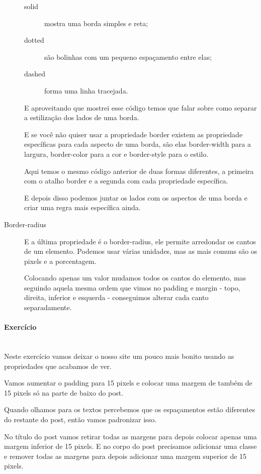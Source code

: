 \documentclass[12pt,a4paper]{article}
\begin{document}
\begin{description}
		\begin{description}
			\item[solid] mostra uma borda simples e reta;
			\item[dotted] são bolinhas com um pequeno espaçamento entre elas;
			\item[dashed] forma uma linha tracejada.
		\end{description}
		
		E aproveitando que mostrei esse código temos que falar sobre como separar a estilização dos lados de uma borda.
		
		E se você não quiser usar a propriedade border existem as propriedade específicas para cada aspecto de uma borda, são elas border-width para a largura, border-color para a cor e border-style para o estilo.
		
		Aqui temos o mesmo código anterior de duas formas diferentes, a primeira com o atalho border e a segunda com cada propriedade específica.
		
		E depois disso podemos juntar os lados com os aspectos de uma borda e criar uma regra mais específica ainda.
		
		\item[Border-radius] E a última propriedade é o border-radius, ele permite arredondar os cantos de um elemento. Podemos usar várias unidades, mas as mais comuns são os pixels e a porcentagem.
		
		Colocando apenas um valor mudamos todos os cantos do elemento, mas seguindo aquela mesma ordem que vimos no padding e margin - topo, direita, inferior e esquerda -  conseguimos alterar cada canto separadamente.
	\end{description}
	
	\paragraph{Exercício} \mbox{} \\
	
	Neste exercício vamos deixar o nosso site um pouco mais bonito usando as propriedades que acabamos de ver.
	
	Vamos aumentar o padding para 15 pixels e colocar uma margem de também de 15 pixels só na parte de baixo do post.
	
	Quando olhamos para os textos percebemos que os espaçamentos estão diferentes do restante do post, então vamos padronizar isso.
	
	No título do post vamos retirar todas as margens para depois colocar apenas uma margem inferior de 15 pixels. E no corpo do post precisamos adicionar uma classe e remover todas as margens para depois adicionar uma margem superior de 15 pixels.
	
\end{document}
